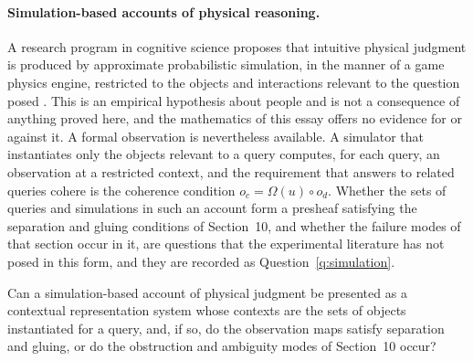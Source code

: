 \paragraph{Simulation-based accounts of physical reasoning.} A research program in cognitive science proposes that intuitive physical judgment is produced by approximate probabilistic simulation, in the manner of a game physics engine, restricted to the objects and interactions relevant to the question posed \cite{ullman}. This is an empirical hypothesis about people and is not a consequence of anything proved here, and the mathematics of this essay offers no evidence for or against it. A formal observation is nevertheless available. A simulator that instantiates only the objects relevant to a query computes, for each query, an observation at a restricted context, and the requirement that answers to related queries cohere is the coherence condition $o_c=\Omega(u)\circ o_d$. Whether the sets of queries and simulations in such an account form a presheaf satisfying the separation and gluing conditions of Section~10, and whether the failure modes of that section occur in it, are questions that the experimental literature has not posed in this form, and they are recorded as Question~\ref{q:simulation}.

\begin{question}\label{q:simulation}
Can a simulation-based account of physical judgment be presented as a contextual representation system whose contexts are the sets of objects instantiated for a query, and, if so, do the observation maps satisfy separation and gluing, or do the obstruction and ambiguity modes of Section~10 occur?
\end{question}

